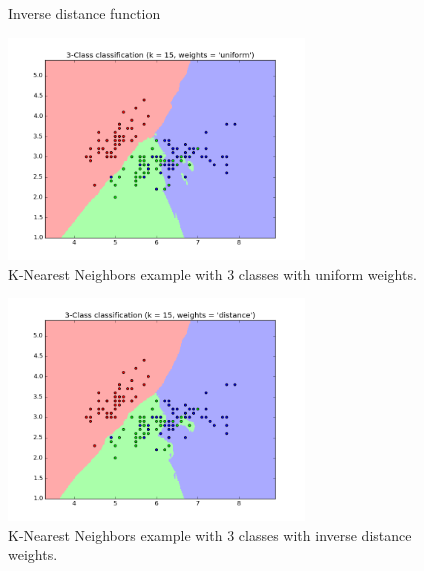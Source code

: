 \begin{figure}[H]
\centering
{}
\caption{Inverse distance function} \label{fig:inverse}
\end{figure}

\begin{figure}[H]
\centering
\includegraphics[width=0.7\textwidth]{Figures/knnExample}
\decoRule
\caption[K-Nearest Neighbors: Uniform weights]{K-Nearest Neighbors example with 3 classes with uniform weights. \cite{knnExample}}
\label{fig:knnExample}
\end{figure}

\begin{figure}[H]
\centering
\includegraphics[width=0.7\textwidth]{Figures/knnExample2}
\decoRule
\caption[K-Nearest Neighbors: Inverse distance weights]{K-Nearest Neighbors example with 3 classes with inverse distance weights. \cite{knnExample}}
\label{fig:knnExample2}
\end{figure}


